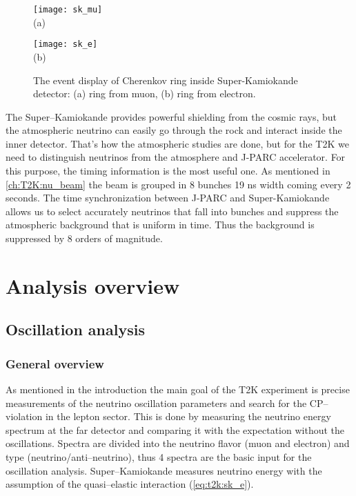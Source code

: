 \documentclass[../main.tex]{subfiles}
\begin{document}
\begin{figure}[!ht]
  \centering
  \begin{minipage}{0.49\linewidth}
    \centering
    \texttt{[image: sk\_mu]} \\ (a)
  \end{minipage}
  \begin{minipage}{0.49\linewidth}
    \centering
    \texttt{[image: sk\_e]} \\ (b)
  \end{minipage}
    \caption{The event display of Cherenkov ring inside Super-Kamiokande detector: (a) ring from muon, (b) ring from electron.}
    \label{fig:T2K:sk_PID}
\end{figure}

The Super--Kamiokande provides powerful shielding from the cosmic rays, but the atmospheric neutrino can easily go through the rock and interact inside the inner detector. That's how the atmospheric studies are done, but for the T2K we need to distinguish neutrinos from the atmosphere and J-PARC accelerator. For this purpose, the timing information is the most useful one. As mentioned in \autoref{ch:T2K:nu_beam} the beam is grouped in 8 bunches 19 ns width coming every 2 seconds. The time synchronization between J-PARC and Super-Kamiokande allows us to select accurately neutrinos that fall into bunches and suppress the atmospheric background that is uniform in time. Thus the background is suppressed by 8 orders of magnitude.


\section{Analysis overview}
\subsection{Oscillation analysis}
\subsubsection{General overview}
As mentioned in the introduction the main goal of the T2K experiment is precise measurements of the neutrino oscillation parameters and search for the CP--violation in the lepton sector. This is done by measuring the neutrino energy spectrum at the far detector and comparing it with the expectation without the oscillations. Spectra are divided into the neutrino flavor (muon and electron) and type (neutrino/anti--neutrino), thus 4 spectra are the basic input for the oscillation analysis. Super--Kamiokande measures neutrino energy with the assumption of the quasi--elastic interaction (\autoref{eq:t2k:sk_e}).
\end{document}
